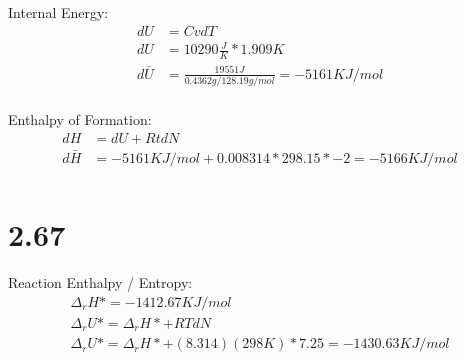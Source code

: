 \documentclass[10pt]{article} %
\begin{document}


Internal Energy:
\begin{align}
  dU &= Cv dT\\
  dU &= 10290 \frac{J}{K} * 1.909K\\
  d\bar{U} &= \frac{19551J}{0.4362g / 128.19 g/mol} = -5161 KJ/mol\\
\end{align}

Enthalpy of Formation:
\begin{align}
  dH &= dU + RtdN\\
  d\bar{H} &= -5161KJ/mol + 0.008314 * 298.15 * -2 = -5166KJ/mol\\  
\end{align}

\section{2.67}




Reaction Enthalpy / Entropy:
\begin{align}
  \Delta_rH* = -1412.67 KJ/mol\\
  \Delta_rU* = \Delta_rH* + RTdN\\
  \Delta_rU* = \Delta_rH* + (8.314)(298K)*7.25 = -1430.63 KJ/mol\\  
\end{align}
\end{document}
